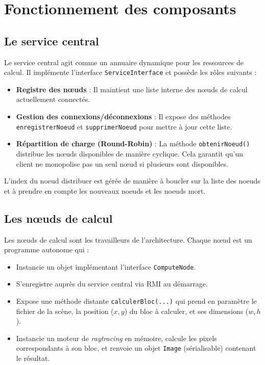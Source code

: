 \documentclass[a4paper,11pt]{article}
\begin{document}
\newpage

\section{Fonctionnement des composants}

\subsection{Le service central}

Le service central agit comme un annuaire dynamique pour les ressources de calcul. Il implémente l'interface \texttt{ServiceInterface} et possède les rôles suivants :
\begin{itemize}
    \item \textbf{Registre des nœuds} : Il maintient une liste interne des nœuds de calcul actuellement connectés.
    \item \textbf{Gestion des connexions/déconnexions} : Il expose des méthodes \texttt{enregistrerNoeud} et \texttt{supprimerNoeud} pour mettre à jour cette liste.
    \item \textbf{Répartition de charge (Round-Robin)} : La méthode \texttt{obtenirNoeud()} distribue les nœuds disponibles de manière cyclique. Cela garantit qu'un client ne monopolise pas un seul nœud si plusieurs sont disponibles.
\end{itemize}
L'index du noeud distribuer est gérée de manière à boucler sur la liste des noeuds et à prendre en compte les nouveaux noeuds et les noeuds mort.

\subsection{Les nœuds de calcul}

Les nœuds de calcul sont les travailleurs de l'architecture. Chaque nœud est un programme autonome qui :
\begin{itemize}
    \item Instancie un objet implémentant l'interface \texttt{ComputeNode}.
    \item S'enregistre auprès du service central via RMI au démarrage.
    \item Expose une méthode distante \texttt{calculerBloc(...)} qui prend en paramètre le fichier de la scène, la position ($x, y$) du bloc à calculer, et ses dimensions ($w, h$).
    \item Instancie un moteur de \textit{raytracing} en mémoire, calcule les pixels correspondants à son bloc, et renvoie un objet \texttt{Image} (sérialisable) contenant le résultat.
\end{itemize}
\end{document}
